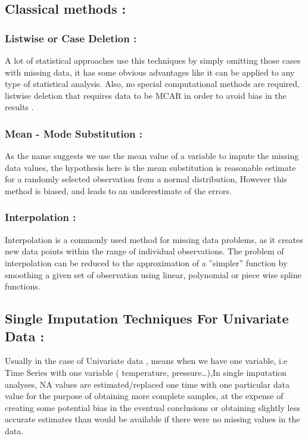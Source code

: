 \subsection{Classical methods :}

\subsubsection{Listwise or Case Deletion :} A lot of statistical approaches use this techniques by simply omitting those cases with missing data, it has some obvious advantages like it can be applied to any type of statistical analysis. Also, no special computational methods are required, listwise deletion that requires data to be MCAR in order to avoid bias in the results \cite{listwise}.

\subsubsection{Mean - Mode Substitution :}
 As the name suggests we use the mean value of a variable to impute the missing data values, the hypothesis here is the mean substitution is reasonable estimate for a randomly selected observation from a normal distribution, However this method is biased, and leads to an underestimate of the errors\cite{mean}. 

\subsubsection{Interpolation :}
Interpolation is a commonly used method for missing data problems, as it creates new data points within the range of individual observations. The problem of interpolation can be reduced to the approximation of a ”simpler” function by smoothing a given set of observation using linear, polynomial or piece wise spline functions. 


\subsection{Single Imputation Techniques For Univariate Data :}
Usually in the case of Univariate data , means when we have one variable, i.e Time Series  with one variable ( temperature, pressure…),In single imputation analyses, NA values are estimated/replaced one time with one particular data value for the purpose of obtaining more complete samples, at the expense of creating some potential bias in the eventual conclusions or obtaining slightly less accurate estimates than would be available if there were no missing values in the data.

